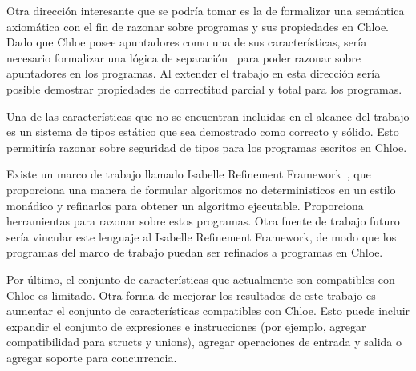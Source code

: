 Otra dirección interesante que se podría tomar es la de formalizar una semántica axiomática con el fin de razonar sobre programas y sus propiedades en Chloe.
Dado que Chloe posee apuntadores como una de sus características, sería necesario formalizar una lógica de separación~\cite{sep-logic} para poder razonar sobre apuntadores en los programas.
Al extender el trabajo en esta dirección sería posible demostrar propiedades de correctitud parcial y total para los programas.

Una de las características que no se encuentran incluidas en el alcance del trabajo es un sistema de tipos estático que sea demostrado como correcto y sólido.
Esto permitiría razonar sobre seguridad de tipos para los programas escritos en Chloe.

Existe un marco de trabajo llamado Isabelle Refinement Framework~\cite{Refine_Monadic-AFP}, que proporciona una manera de formular algoritmos no deterministicos en un estilo monádico y refinarlos para obtener un algoritmo ejecutable.
Proporciona herramientas para razonar sobre estos programas.
Otra fuente de trabajo futuro sería vincular este lenguaje al Isabelle Refinement Framework, de modo que los programas del marco de trabajo puedan ser refinados a programas en Chloe.

Por último, el conjunto de características que actualmente son compatibles con Chloe es limitado.
Otra forma de meejorar los resultados de este trabajo es aumentar el conjunto de características compatibles con Chloe.
Esto puede incluir expandir el conjunto de expresiones e instrucciones (por ejemplo, agregar compatibilidad para structs y unions), agregar operaciones de entrada y salida o agregar soporte para concurrencia.
